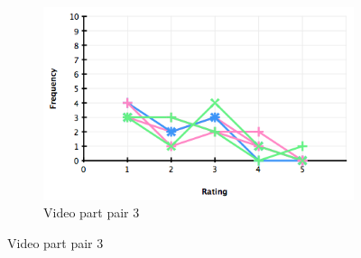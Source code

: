 \begin{figure}
\begin{subfigure}[b]{.32\textwidth}
      \includegraphics[width=\textwidth]{img/evaluation/hist_video3}
    \caption{Video part pair 3}
    \label{fig:evalVideo3}
  \end{subfigure}
  

\end{figure}
